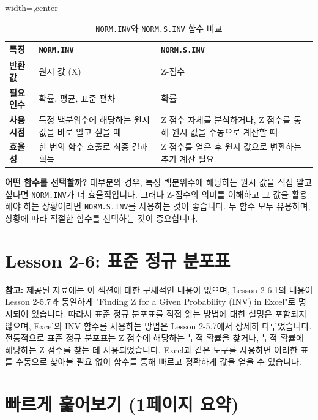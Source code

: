 \documentclass[11pt,a4paper]{book}
\providecommand{\newsection}{\section}
\theoremstyle{definition}
\begin{document}
\begin{table}[h!]
\centering
\caption{\texttt{NORM.INV}와 \texttt{NORM.S.INV} 함수 비교}
\label{tab:inv_functions_comparison}
\begin{adjustbox}{width=\textwidth,center}
\begin{tabular}{lll}
\toprule
\textbf{특징} & \textbf{\texttt{NORM.INV}} & \textbf{\texttt{NORM.S.INV}} \\
\midrule
\textbf{반환 값} & 원시 값 (X) & Z-점수 \\
\textbf{필요 인수} & 확률, 평균, 표준 편차 & 확률 \\
\textbf{사용 시점} & 특정 백분위수에 해당하는 원시 값을 바로 알고 싶을 때 & Z-점수 자체를 분석하거나, Z-점수를 통해 원시 값을 수동으로 계산할 때 \\
\textbf{효율성} & 한 번의 함수 호출로 최종 결과 획득 & Z-점수를 얻은 후 원시 값으로 변환하는 추가 계산 필요 \\
\bottomrule
\end{tabular}
\end{adjustbox}
\end{table}

\begin{infobox}
    \textbf{어떤 함수를 선택할까?}
    대부분의 경우, 특정 백분위수에 해당하는 원시 값을 직접 알고 싶다면 \texttt{NORM.INV}가 더 효율적입니다.
    그러나 Z-점수의 의미를 이해하고 그 값을 활용해야 하는 상황이라면 \texttt{NORM.S.INV}를 사용하는 것이 좋습니다.
    두 함수 모두 유용하며, 상황에 따라 적절한 함수를 선택하는 것이 중요합니다.
\end{infobox}

\newsection{Lesson 2-6: 표준 정규 분포표}

\begin{summarybox}
    \textbf{참고:}
    제공된 자료에는 이 섹션에 대한 구체적인 내용이 없으며, Lesson 2-6.1의 내용이 Lesson 2-5.7과 동일하게 "Finding Z for a Given Probability (INV) in Excel"로 명시되어 있습니다.
    따라서 표준 정규 분포표를 직접 읽는 방법에 대한 설명은 포함되지 않으며, Excel의 INV 함수를 사용하는 방법은 Lesson 2-5.7에서 상세히 다루었습니다.
    전통적으로 표준 정규 분포표는 Z-점수에 해당하는 누적 확률을 찾거나, 누적 확률에 해당하는 Z-점수를 찾는 데 사용되었습니다.
    Excel과 같은 도구를 사용하면 이러한 표를 수동으로 찾아볼 필요 없이 함수를 통해 빠르고 정확하게 값을 얻을 수 있습니다.
\end{summarybox}

\newsection{빠르게 훑어보기 (1페이지 요약)}
\end{document}
